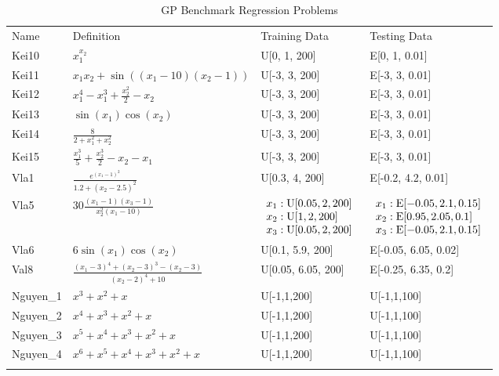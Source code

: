 \begin{table}
\caption{GP Benchmark Regression Problems}
\label{tab:Problem}       %
\begin{tabular}{llll}
\hline\noalign{\smallskip}
Name &  Definition & Training Data  & Testing Data\\
\noalign{\smallskip}\hline\noalign{\smallskip}
Kei10 &	 $x_{1}^{x_{2}}$ & U[0, 1, 200]	& E[0, 1, 0.01] \\
Kei11 & $x_{1}x_{2}+\sin((x_{1}-10)(x_{2}-1))$& U[-3, 3, 200] & E[-3, 3, 0.01] \\
Kei12 & $x_{1}^4-x_{1}^3+\frac{x_{2}^2}{2}-x_{2}$ & U[-3, 3, 200]	& E[-3, 3, 0.01] \\
Kei13 & $\sin(x_{1})\cos(x_{2})$ & U[-3, 3, 200]	& E[-3, 3, 0.01] \\
Kei14 & $\frac{8}{2+x_{1}^2+x_{2}^2}$ & U[-3, 3, 200]	& E[-3, 3, 0.01] \\
Kei15 & $\frac{x_{1}^3}{5}+\frac{x_{2}^3}{2}-x_{2}-x_{1}$ & U[-3, 3, 200]	& E[-3, 3, 0.01] \\
Vla1 & $\frac{{e^{{(x_{1}-1)}^2}}}{1.2+(x_{2}-2.5)^2}$ & U[0.3, 4, 200] & E[-0.2, 4.2, 0.01] \\
Vla5 & $30\frac{(x_{1}-1)(x_{3}-1)}{x_{2}^2(x_{1}-10)}$ &
$\begin{array}{l} x_{1}: \textnormal{U}[0.05, 2, 200] \\ %
x_{2}: \textnormal{U}[1, 2, 200]\\
x_{3}: \textnormal{U}[0.05, 2, 200] \end{array}$	& $\begin{array}{l} x_{1}: \textnormal{E}[-0.05, 2.1, 0.15]\\
x_{2}: \textnormal{E}[0.95, 2.05, 0.1] \\
x_{3}: \textnormal{E}[-0.05, 2.1, 0.15] \end{array} $\\
Vla6 & $6\sin(x_{1})\cos(x_{2})$ & U[0.1, 5.9, 200] & E[-0.05, 6.05, 0.02] \\
Val8 & $\frac{(x_{1}-3)^4+(x_{2}-3)^3-(x_{2}-3)}{(x_{2}-2)^4+10}$ & U[0.05, 6.05, 200] &	E[-0.25, 6.35, 0.2] \\
Nguyen\_1 & $ x^3+x^2+x $ & U[-1,1,200] & U[-1,1,100] \\
Nguyen\_2 & $ x^4+x^3+x^2+x $ & U[-1,1,200]	& U[-1,1,100] \\
Nguyen\_3 & $ x^5+x^4+x^3+x^2+x $ & U[-1,1,200]	& U[-1,1,100] \\
Nguyen\_4 & $ x^6+x^5+x^4+x^3+x^2+x $ & U[-1,1,200]	& U[-1,1,100] \\
\noalign{\smallskip}\hline
\end{tabular}
\end{table}

